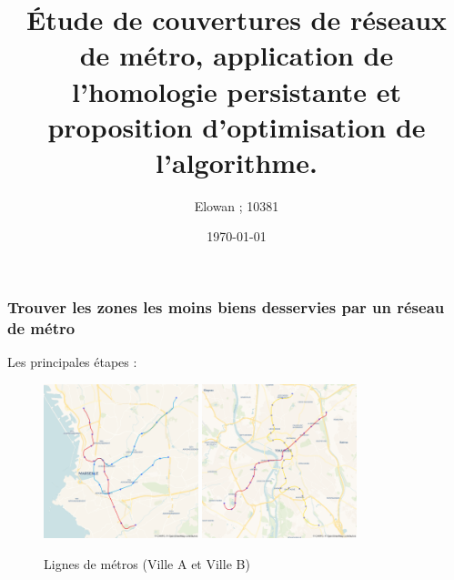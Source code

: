 \documentclass{beamer}
\begin{document}
\title{Étude de couvertures de réseaux de métro, application de 
l'homologie persistante et proposition d'optimisation de l'algorithme.}
\author{Elowan ; 10381}
\date{\today}

\maketitle

\begin{frame}
    \frametitle{Trouver les zones les moins biens desservies par un réseau de métro}    
    Les principales étapes : 

    \begin{figure}
        \includegraphics[width=0.4\textwidth]{../images/marseille_blank.png}
        \hfill
        \includegraphics[width=0.4\textwidth]{../images/toulouse_blank.png}
        \centering
        \caption{Lignes de métros (Ville A et Ville B)}
    \end{figure}
    
    
\end{frame}
\end{document}
